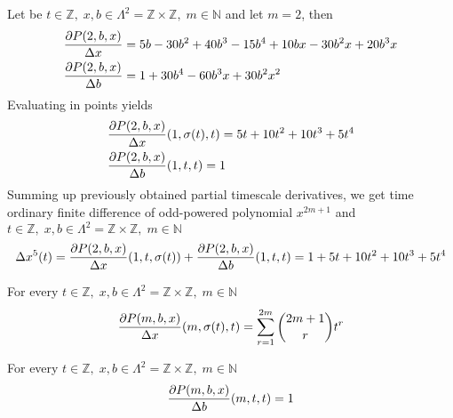 \begin{examp}
    \label{time_scale_z_example_2}
    Let be $t\in\mathbb{Z}, \;x,b\in\Lambda^2 = \mathbb{Z} \times \mathbb{Z}, \; m\in\mathbb{N}$
    and let $m=2$, then
    \begin{align*}
        &\frac{\partial P ( 2, b, x )}{\Delta x}                = 5 b - 30 b^2 + 40 b^3 - 15 b^4 + 10 b x - 30 b^2 x + 20 b^3 x \\
        &\frac{\partial P ( 2, b, x )}{\Delta b}                = 1 + 30 b^4 - 60 b^3 x + 30 b^2 x^2
    \end{align*}
    Evaluating in points yields
    \begin{align*}
        &\frac{\partial P ( 2, b, x )}{\Delta x} (1, \sigma(t), t) = 5 t + 10 t^2 + 10 t^3 + 5 t^4 \\
        &\frac{\partial P ( 2, b, x )}{\Delta b} (1, t, t)         = 1
    \end{align*}
    Summing up previously obtained partial timescale derivatives, we get time ordinary finite difference of odd-powered
    polynomial $x^{2m+1}$ and $t\in\mathbb{Z}, \;x,b\in\Lambda^2 = \mathbb{Z} \times \mathbb{Z}, \; m\in\mathbb{N}$
    \begin{align*}
        \Delta x^{5} (t)
        = \frac{\partial P ( 2, b, x )}{\Delta x} (1, t, \sigma(t))
        + \frac{\partial P ( 2, b, x )}{\Delta b} (1, t, t)
        = 1 + 5 t + 10 t^2 + 10 t^3 + 5 t^4
    \end{align*}
\end{examp}
\begin{cor}
    \label{time_scale_z_corollary_1}
    For every $t\in\mathbb{Z}, \; x,b\in\Lambda^2 = \mathbb{Z} \times \mathbb{Z}, \; m\in\mathbb{N}$
    \begin{align*}
        \frac{\partial P ( m, b, x )}{\Delta x} (m, \sigma(t), t)
        = \sum_{r=1}^{2m} \binom{2m+1}{r} t^{r}
    \end{align*}
\end{cor}
\begin{cor}
    \label{time_scale_z_corollary_2}
    For every $t\in\mathbb{Z}, \; x,b\in\Lambda^2 = \mathbb{Z} \times \mathbb{Z}, \; m\in\mathbb{N}$
    \begin{align*}
        \frac{\partial P ( m, b, x )}{\Delta b} (m, t, t) = 1
    \end{align*}
\end{cor}

